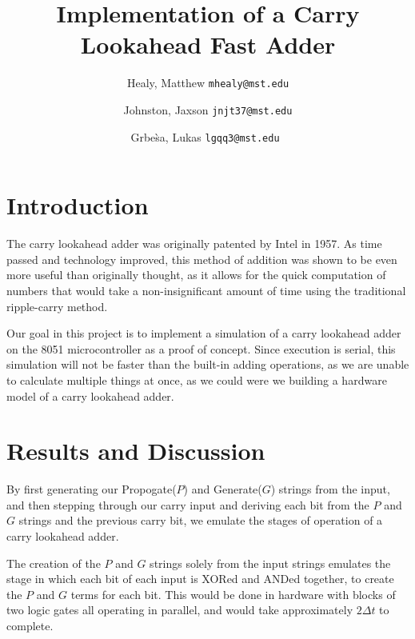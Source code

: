 \documentclass[journal]{IEEEtran}
\begin{document}
\title{Implementation of a Carry Lookahead Fast Adder}
\author{
	Healy, Matthew
	\texttt{mhealy@mst.edu}\\
	\and
	Johnston, Jaxson
	\texttt{jnjt37@mst.edu}\\
	\and
	Grbe\`sa, Lukas
	\texttt{lgqq3@mst.edu}\
}

\maketitle


\begin{abstract}

\end{abstract}

\section{Introduction}\label{sec:intro}
The carry lookahead adder was originally patented by Intel\cite{patent} in 1957.
As time passed and technology improved, this method of addition was shown
to be even more useful than originally thought, as it allows for the quick
computation of numbers that would take a non-insignificant amount of time
using the traditional ripple-carry method.

Our goal in this project is to implement a simulation of a carry lookahead
adder on the 8051 microcontroller as a proof of concept. Since execution is
serial, this simulation will not be faster than the built-in adding operations,
as we are unable to calculate multiple things at once, as we could were we
building a hardware model of a carry lookahead adder.

\section{Results and Discussion}\label{sec:discuss}

By first generating our Propogate($P$) and Generate($G$) strings from the input,
and then stepping through our carry input and deriving each bit from the
$P$ and $G$ strings and the previous carry bit, we emulate the stages of
operation of a carry lookahead adder.

The creation of the $P$ and $G$ strings solely from the input strings emulates
the stage in which each bit of each input is XORed and ANDed together, to create
the $P$ and $G$ terms for each bit. This would be done in hardware with blocks
of two logic gates all operating in parallel, and would take approximately
$2\Delta t$ to complete.
\end{document}
